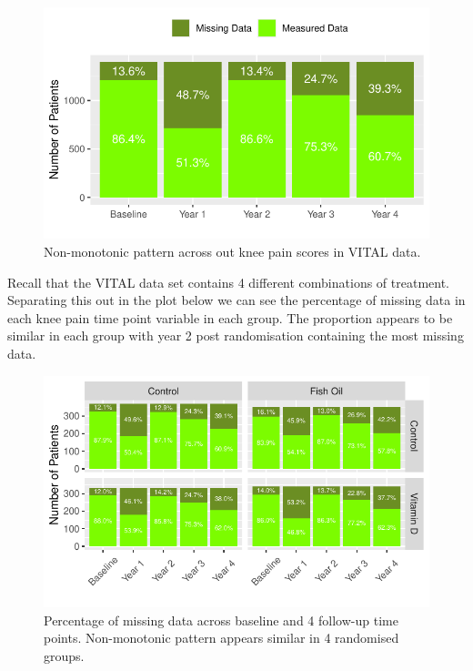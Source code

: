 \documentclass{article}
\begin{document}
\begin{figure}

{\centering \includegraphics{Final_Report_files/figure-latex/unnamed-chunk-21-1} 

}

\caption{Non-monotonic pattern across out knee pain scores in VITAL data.}\label{fig:unnamed-chunk-21}
\end{figure}

Recall that the VITAL data set contains 4 different combinations of
treatment. Separating this out in the plot below we can see the
percentage of missing data in each knee pain time point variable in each
group. The proportion appears to be similar in each group with year 2
post randomisation containing the most missing data.

\begin{figure}

{\centering \includegraphics{Final_Report_files/figure-latex/unnamed-chunk-22-1} 

}

\caption{Percentage of missing data across baseline and 4 follow-up time points. Non-monotonic pattern appears similar in 4 randomised groups.}\label{fig:unnamed-chunk-22}
\end{figure}
\end{document}
